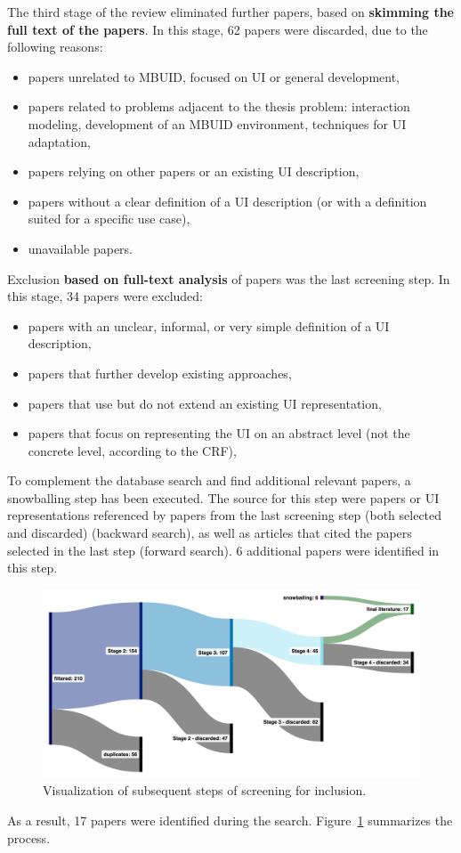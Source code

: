 The third stage of the review eliminated further papers, based on \textbf{skimming the full text of the papers}.
In this stage, 62 papers were discarded, due to the following reasons:
\begin{itemize}
    \item papers unrelated to MBUID, focused on UI or general development,
    \item papers related to problems adjacent to the thesis problem: interaction modeling, development of an MBUID environment, techniques for UI adaptation,
    \item papers relying on other papers or an existing UI description,
    \item papers without a clear definition of a UI description (or with a definition suited for a specific use case),
    \item unavailable papers.
\end{itemize}

Exclusion \textbf{based on full-text analysis} of papers was the last screening step.
In this stage, 34 papers were excluded:
\begin{itemize}
    \item papers with an unclear, informal, or very simple definition of a UI description,
    \item papers that further develop existing approaches,
    \item papers that use but do not extend an existing UI representation,
    \item papers that focus on representing the UI on an abstract level (not the concrete level, according to the CRF),
\end{itemize}

To complement the database search and find additional relevant papers, a snowballing step has been executed.
The source for this step were papers or UI representations referenced by papers from the last screening step (both selected and discarded) (backward search), as well as articles that cited the papers selected in the last step (forward search).
6 additional papers were identified in this step.

\begin{figure}
    \centering
    \includegraphics[width=\textwidth]{./2-literature-review/conducting-the-search}
    \caption{Visualization of subsequent steps of screening for inclusion.}
    \label{fig:conducting-the-search-vis}
\end{figure}

As a result, 17 papers were identified during the search.
Figure~\ref{fig:conducting-the-search-vis} summarizes the process.

